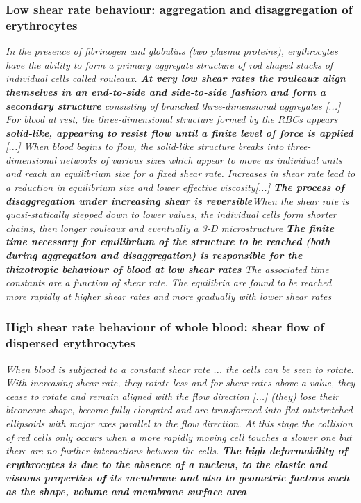 \documentclass[11pt,letterpaper]{article}
\begin{document}
\subsubsection*{Low shear rate behaviour: aggregation and disaggregation of erythrocytes} \textit{In the presence of fibrinogen and globulins (two plasma proteins), erythrocytes have the ability to form a primary aggregate structure of rod shaped stacks of individual cells called rouleaux. \textbf{At very low shear rates the rouleaux align themselves in an end-to-side and side-to-side fashion and form a secondary structure} consisting of branched three-dimensional aggregates [...] For blood at rest, the three-dimensional structure formed by the RBCs
appears \textbf{solid-like, appearing to resist flow until a finite level of force is applied} [...] \newline When blood begins to flow, the solid-like structure breaks into three-dimensional networks of various sizes which appear to move as individual units and reach an equilibrium size for a fixed shear rate. Increases in shear rate lead to a reduction in equilibrium size and lower effective viscosity[...] \newline \newline 
\textbf{The process of disaggregation under increasing shear is reversible}When the shear rate is quasi-statically stepped down to lower values, the individual cells form shorter chains, then longer rouleaux and eventually a 3-D microstructure \newline \newline 
{\color{blue}\textbf{The finite time necessary for equilibrium of the structure to be reached (both during aggregation and disaggregation) is responsible for the thixotropic behaviour of blood at low shear rates} \newline The associated time constants are a function of shear rate. The equilibria are found to be reached more rapidly at higher shear rates and more gradually with lower shear rates}}

\subsubsection*{High shear rate behaviour of whole blood: shear flow of dispersed erythrocytes}\textit{When blood is subjected to a constant shear rate ... the cells can be seen to rotate. With increasing shear rate, they rotate less and for shear rates above a value, they cease to rotate and remain aligned with the flow direction [...] (they) lose their biconcave shape, become fully elongated and are transformed into flat outstretched ellipsoids with major axes parallel to the flow direction. At this stage the collision of red cells only occurs when a more rapidly moving cell touches a slower one but there are no further interactions between the cells. \newline \newline 
{\color{blue}\textbf{The high deformability of erythrocytes is due to the absence of a nucleus, to the elastic and viscous properties of its membrane and also to geometric factors such as the shape, volume and membrane surface area}}}
\end{document}
